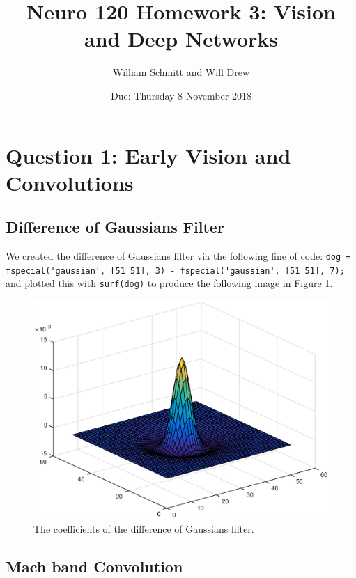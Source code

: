 \documentclass[11pt, oneside]{article}
\title{Neuro 120 Homework 3: Vision and Deep Networks}
\author{William Schmitt and Will Drew}
\date{Due: Thursday 8 November 2018}
\begin{document}
\maketitle

\section{Question 1: Early Vision and Convolutions}

\subsection{Difference of Gaussians Filter}

We created the difference of Gaussians filter via the following line of code: \lstinline{dog = fspecial('gaussian', [51 51], 3) - fspecial('gaussian', [51 51], 7);} and plotted this with \lstinline{surf(dog)} to produce the following image in Figure \ref{fig:dog}.

\begin{figure}[ht!]
\includegraphics[width=1\textwidth]{dog.eps}
\caption{The coefficients of the difference of Gaussians filter.}
\label{fig:dog}
\end{figure}

\subsection{Mach band Convolution}
\end{document}
